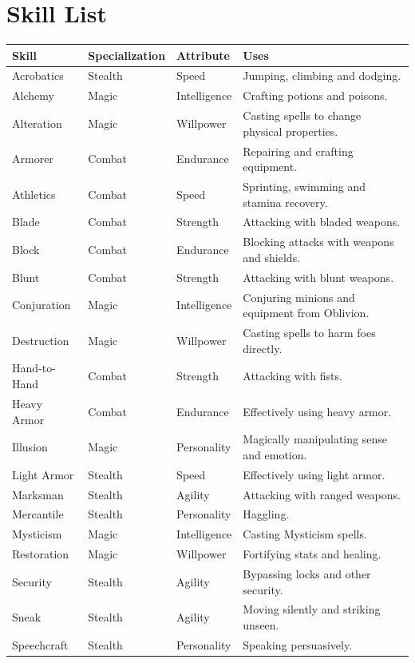 \documentclass[12pt]{book}
\begin{document}
\section{Skill List}

\begin{tabular}{p{}|p{}|p{}|p{}}

Skill & Specialization & Attribute & Uses\\ \hline
Acrobatics & Stealth & Speed & Jumping, climbing and dodging.\\ \hline
Alchemy & Magic & Intelligence & Crafting potions and poisons.\\ \hline
Alteration & Magic & Willpower & Casting spells to change physical properties.\\ \hline
Armorer & Combat & Endurance & Repairing and crafting equipment.\\ \hline
Athletics & Combat & Speed & Sprinting, swimming and stamina recovery.\\ \hline
Blade & Combat & Strength & Attacking with bladed weapons.\\ \hline
Block & Combat & Endurance & Blocking attacks with weapons and shields.\\ \hline
Blunt & Combat & Strength & Attacking with blunt weapons.\\ \hline
Conjuration & Magic & Intelligence & Conjuring minions and equipment from Oblivion.\\ \hline
Destruction & Magic & Willpower & Casting spells to harm foes directly.\\ \hline
Hand-to-Hand & Combat & Strength & Attacking with fists.\\ \hline
Heavy Armor & Combat & Endurance & Effectively using heavy armor.\\ \hline
Illusion & Magic & Personality & Magically manipulating sense and emotion.\\ \hline
Light Armor & Stealth & Speed & Effectively using light armor.\\ \hline
Marksman & Stealth & Agility & Attacking with ranged weapons.\\ \hline
Mercantile & Stealth & Personality & Haggling.\\ \hline
Mysticism & Magic & Intelligence & Casting Mysticism spells.\\ \hline
Restoration & Magic & Willpower & Fortifying stats and healing.\\ \hline
Security & Stealth & Agility & Bypassing locks and other security.\\ \hline
Sneak & Stealth & Agility & Moving silently and striking unseen.\\ \hline
Speechcraft & Stealth & Personality & Speaking persuasively.\\
\end{tabular}
\end{document}
